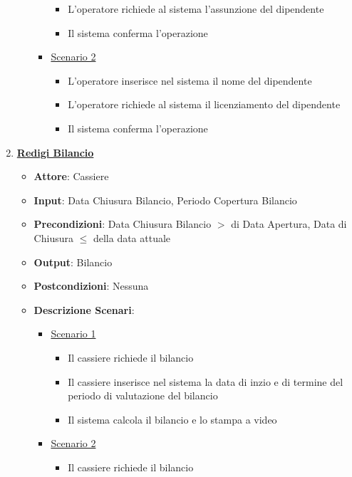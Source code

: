 \begin{enumerate}
\begin{itemize}
\begin{itemize}
\begin{itemize}
                \item L'operatore richiede al sistema l'assunzione del dipendente
                \item Il sistema conferma l'operazione
            \end{itemize}
            \item \uline{Scenario 2}
            \begin{itemize}
                \item L'operatore inserisce nel sistema il nome del dipendente
                \item L'operatore richiede al sistema il licenziamento del dipendente
                \item Il sistema conferma l'operazione
            \end{itemize}
        \end{itemize}     
    \end{itemize}
    \item \uline {{\bf Redigi Bilancio}}
    \begin{itemize}
        \item {\bf Attore}: Cassiere
        \item {\bf Input}: Data Chiusura Bilancio, Periodo Copertura Bilancio
        \item {\bf Precondizioni}: Data Chiusura Bilancio $>$ di Data Apertura, Data di Chiusura $\leq$
            della data attuale
        \item {\bf Output}: Bilancio
        \item {\bf Postcondizioni}: Nessuna
        \item {\bf Descrizione Scenari}:
        \begin{itemize}
            \item \uline{Scenario 1}
            \begin{itemize}
                \item Il cassiere richiede il bilancio
                \item Il cassiere inserisce nel sistema la data di inzio e di termine del
                    periodo di valutazione del bilancio
                \item Il sistema calcola il bilancio e lo stampa a video
            \end{itemize}
            \item \uline{Scenario 2}
            \begin{itemize}
                \item Il cassiere richiede il bilancio

\end{itemize}
\end{itemize}
\end{itemize}
\end{enumerate}
